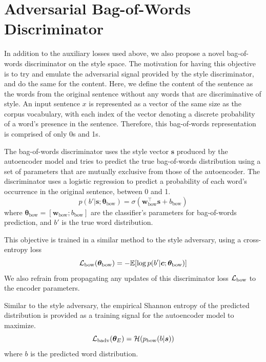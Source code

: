 \section{Adversarial Bag-of-Words Discriminator} \label{sec:adversarial-bow-objective}

In addition to the auxiliary losses used above, we also propose a novel bag-of-words discriminator on the style space. The motivation for having this objective is to try and emulate the adversarial signal provided by the style discriminator, and do the same for the content. Here, we define the content of the sentence as the words from the original sentence without any words that are discriminative of style. An input sentence $x$ is represented as a vector of the same size as the corpus vocabulary, with each index of the vector denoting a discrete probability of a word's presence in the sentence. Therefore, this bag-of-words representation is comprised of only 0s and 1s.

The bag-of-words discriminator uses the style vector $\bm s$ produced by the autoencoder model and tries to predict the true bag-of-words distribution using a set of parameters that are mutually exclusive from those of the autoencoder. The discriminator uses a logistic regression to predict a probability of each word's occurrence in the original sentence, between 0 and 1.
\begin{equation}
	p(b' | \bm s; \bm\theta_\text{bow}) = \sigma(\bm w_\text{bow}^\top \bm s + b_\text{bow})
\end{equation}
where $\bm\theta_\text{bow}=[\bm w_\text{bow}; b_\text{bow}]$ are the classifier's parameters for bag-of-words prediction, and $b'$ is the true word distribution.

This objective is trained in a similar method to the style adversary, using a cross-entropy loss
\begin{equation} \label{eqn:adv-bow-disc-loss}
	\mathcal{L}_\text{bow}(\bm\theta_\text{bow}) =
	- \mathbb{E} [\log p(b' | \bm c; \bm\theta_\text{bow})]
\end{equation}
We also refrain from propagating any updates of this discriminator loss $\mathcal{L}_\text{bow}$ to the encoder parameters.

Similar to the style adversary, the empirical Shannon entropy of the predicted distribution is provided as a training signal for the autoencoder model to maximize.
\begin{equation}
	\mathcal{L}_\text{badv}(\bm\theta_E) = \mathcal{H}(p_\text{bow}(b | \bm s))
\end{equation}
where $b$ is the predicted word distribution.

